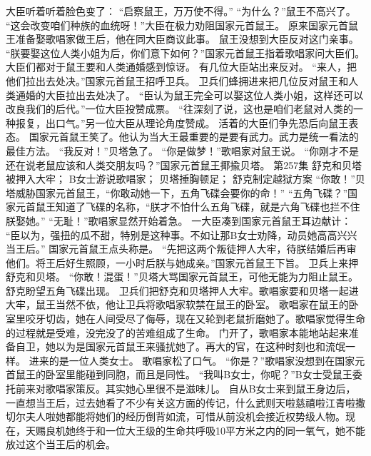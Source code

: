 \documentclass[a4paper,12pt,UTF8,twoside]{ctexbook}
\begin{document}
        大臣听着听着脸色变了：  
        “启察鼠王，万万使不得。”  
        “为什么？”鼠王不高兴了。  
        “这会改变咱们种族的血统呀！”大臣在极力劝阻国家元首鼠王。        
        原来国家元首鼠王准备娶歌唱家做王后，他在同大臣商议此事。  
        鼠王没想到大臣反对这门亲事。  
        “朕要娶这位人类小姐为后，你们意下如何？”国家元首鼠王指着歌唱家问大臣们。  
        大臣们都对于鼠王要和人类通婚感到惊讶。  
        有几位大臣站出来反对。  
        “来人，把他们拉出去处决。”国家元首鼠王招呼卫兵。  
        卫兵们蜂拥进来把几位反对鼠王和人类通婚的大臣拉出去处决了。  
        “臣认为鼠王完全可以娶这位人类小姐，这样还可以改良我们的后代。”一位大臣投赞成票。  
        “往深刻了说，这也是咱们老鼠对人类的一种报复，出口气。”另一位大臣从理论角度赞成。  
        活着的大臣们争先恐后向鼠王表态。  
        国家元首鼠王笑了。他认为当大王最重要的是要有武力。武力是统一看法的最佳方法。  
      “我反对！”贝塔急了。  
      “你是做梦！”歌唱家对鼠王说。  
      “你刚才不是还在说老鼠应该和人类交朋友吗？”国家元首鼠王揶揄贝塔。          第257集  
        舒克和贝塔被押入大牢；  
        B女士游说歌唱家；  
        贝塔捶胸顿足；  
        舒克制定越狱方案    
        “你敢！”贝塔威胁国家元首鼠王，“你敢动她一下，五角飞碟会要你的命！”  
        “五角飞碟？”国家元首鼠王知道了飞碟的名称，“朕才不怕什么五角飞碟，就是六角飞碟也拦不住朕娶她。”  
        “无耻！”歌唱家显然开始着急。  
        一大臣凑到国家元首鼠王耳边献计：  
        “臣以为，强扭的瓜不甜，特别是这种事。不如让那B女士劝降，动员她高高兴兴当王后。”  
        国家元首鼠王点头称是。  
        “先把这两个叛徒押人大牢，待朕结婚后再审他们。将王后好生照顾，一小时后朕与她成亲。”国家元首鼠王下旨。  
        卫兵上来押舒克和贝塔。  
        “你敢！混蛋！”贝塔大骂国家元首鼠王，可他无能为力阻止鼠王。  
        舒克盼望五角飞碟出现。  
        卫兵们把舒克和贝塔押人大牢。歌唱家要和贝塔一起进大牢，鼠王当然不依，他让卫兵将歌唱家软禁在鼠王的卧室。  
        歌唱家在鼠王的卧室里咬牙切齿，她在人间受尽了侮辱，现在又轮到老鼠折磨她了。歌唱家觉得生命的过程就是受难，没完没了的苦难组成了生命。  
        门开了，歌唱家本能地站起来准备自卫，她以为是国家元首鼠王来骚扰她了。再大的官，在这种时刻也和流氓一样。  
        进来的是一位人类女士。  
        歌唱家松了口气。  
        “你是？”歌唱家没想到在国家元首鼠王的卧室里能碰到同胞，而且是同性。  
        “我叫B女士，你呢？”B女士受鼠王委托前来对歌唱家策反。其实她心里很不是滋味儿。  
        自从B女士来到鼠王身边后，一直想当王后，过去她看了不少有关这方面的传记，什么武则天啦慈禧啦江青啦撒切尔夫人啦她都能将她们的经历倒背如流，可惜从前没机会接近权势级人物。现在，天赐良机她终于和一位大王级的生命共呼吸10平方米之内的同一氧气，她不能放过这个当王后的机会。  
\end{document}
